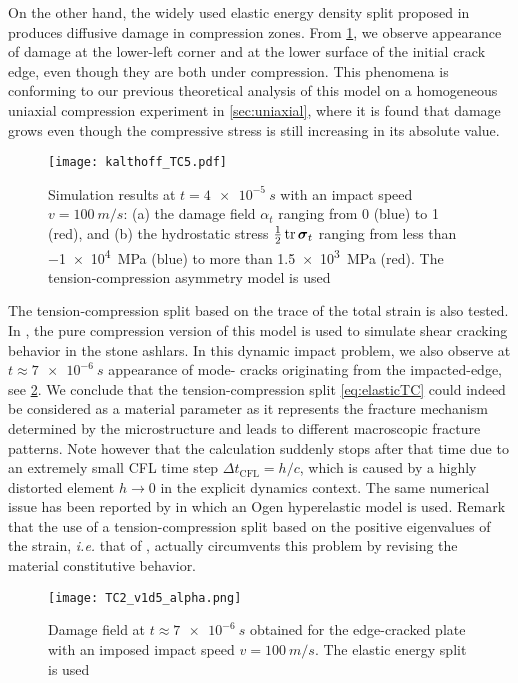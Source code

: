 On the other hand, the widely used elastic energy density split proposed in \cite{MieheHofackerWelschinger:2010} produces diffusive damage in compression zones. From \cref{fig:v1d5_miehe}, we observe appearance of damage at the lower-left corner and at the lower surface of the initial crack edge, even though they are both under compression. This phenomena is conforming to our previous theoretical analysis of this model on a homogeneous uniaxial compression experiment in \cref{sec:uniaxial}, where it is found that damage grows even though the compressive stress is still increasing in its absolute value.
\begin{figure}[htbp]
\centering
\texttt{[image: kalthoff\_TC5.pdf]}
\caption{Simulation results at $t=\SI{4e-5}{s}$ with an impact speed $v=\SI{100}{m/s}$: (a) the damage field $\alpha_t$ ranging from 0 (blue) to 1 (red), and (b) the hydrostatic stress $\frac{1}{2}\tr\sig_t$ ranging from less than \SI{-1e4}{MPa} (blue) to more than \SI{1.5e3}{MPa} (red). The tension-compression asymmetry model \cite{MieheHofackerWelschinger:2010} is used} \label{fig:v1d5_miehe}
\end{figure}

The tension-compression split based on the trace of the total strain \cite{AmorMarigoMaurini:2009} is also tested. In \cite{LancioniRoyer-Carfagni:2009}, the pure compression version of this model is used to simulate shear cracking behavior in the stone ashlars. In this dynamic impact problem, we also observe at $t\approx\SI{7e-6}{s}$ appearance of mode- cracks originating from the impacted-edge, see \cref{fig:TC2}. We conclude that the tension-compression split \eqref{eq:elasticTC} could indeed be considered as a material parameter as it represents the fracture mechanism determined by the microstructure and leads to different macroscopic fracture patterns. Note however that the calculation suddenly stops after that time due to an extremely small CFL time step $\Delta t_\mathrm{CFL}=h/c$, which is caused by a highly distorted element $h\to 0$ in the explicit dynamics context. The same numerical issue has been reported by \cite{PieroLancioniMarch:2007} in which an Ogen hyperelastic model is used. Remark that the use of a tension-compression split based on the positive eigenvalues of the strain, \emph{i.e.} that of \cite{MieheHofackerWelschinger:2010,FreddiRoyer-Carfagni:2010}, actually circumvents this problem by revising the material constitutive behavior.
\begin{figure}[htbp]
\centering
\texttt{[image: TC2\_v1d5\_alpha.png]}
\caption{Damage field at $t\approx\SI{7e-6}{s}$ obtained for the edge-cracked plate with an imposed impact speed $v=\SI{100}{m/s}$. The elastic energy split \cite{AmorMarigoMaurini:2009} is used} \label{fig:TC2}
\end{figure}

